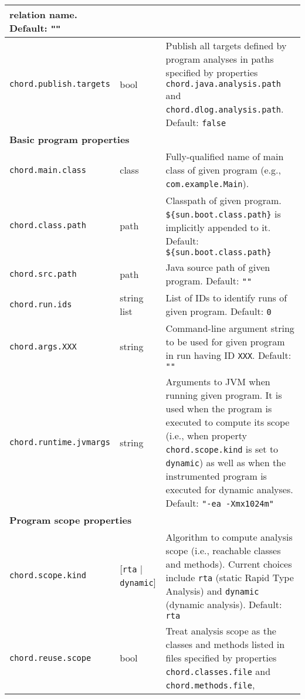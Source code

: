\begin{longtable}{|l|p{0.4in}|p{4.0in}|}
relation name. 
\newline Default: \verb+""+ \\
\hline
\verb+chord.publish.targets+ & bool & Publish all targets defined by program analyses in
paths specified by properties \verb+chord.java.analysis.path+ and
\verb+chord.dlog.analysis.path+.
\newline Default: \verb+false+ \\
\hline
\hline
\multicolumn{3}{|l|}{{\bf Basic program properties}} \\
\hline
\verb+chord.main.class+ & class & Fully-qualified name of main class of given program
(e.g., \verb+com.example.Main+). \\
\hline
\verb+chord.class.path+ & path & Classpath of given program. \verb+${sun.boot.class.path}+
is implicitly appended to it.
\newline Default: \verb+${sun.boot.class.path}+ \\
\hline
\verb+chord.src.path+ & path & Java source path of given program.
\newline Default: \verb+""+ \\
\hline
\verb+chord.run.ids+ & string list & List of IDs to identify runs of given program.
\newline Default: \verb+0+ \\
\hline
\verb+chord.args.XXX+ & string & Command-line argument string to be used for given
program in run having ID \verb+XXX+.
\newline Default: \verb+""+ \\
\hline
\verb+chord.runtime.jvmargs+ & string & Arguments to JVM when running given program.
It is used when the program is executed to compute its scope (i.e., when property
\verb+chord.scope.kind+ is set to \verb+dynamic+) as well as when the instrumented
program is executed for dynamic analyses.
\newline Default: \verb+"-ea -Xmx1024m"+ \\ 
\hline
\hline
\multicolumn{3}{|l|}{{\bf Program scope properties}} \\ 
\hline
\verb+chord.scope.kind+ & [\verb+rta+ $|$ \verb+dynamic+] & Algorithm to compute
analysis scope (i.e., reachable classes and methods).  Current choices include
\verb+rta+ (static Rapid Type Analysis) and \verb+dynamic+ (dynamic analysis).
\newline Default: \verb+rta+ \\
\hline
\verb+chord.reuse.scope+ & bool & Treat analysis scope as the classes and methods listed
in files specified by properties \verb+chord.classes.file+ and \verb+chord.methods.file+,

\end{longtable}
